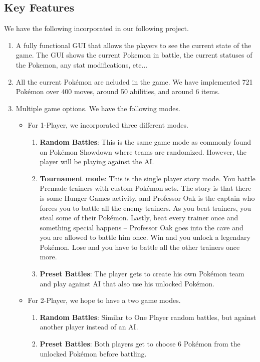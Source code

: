 \documentclass{scrreprt}
\begin{document}
\subsection{Key Features}
We have the following incorporated in our following project.
\begin{enumerate}
	\item A fully functional GUI that allows the players to see the current state of the game. The GUI shows the current Pokemon in battle, the current statuses of the Pokemon, any stat modifications, etc... 
	\item All the current Pok\'emon are ncluded in the game. We have implemented 721 Pok\'emon over 400 moves, around 50 abilities, and around 6 items.
	\item Multiple game options. We have the following modes.
		\begin{itemize}
			\item For 1-Player, we incorporated three different modes. 
				\begin{enumerate}
					\item \textbf{Random Battles}: This is the same game mode as commonly found on Pok\'emon Showdown where teams are randomized. However, the player will be playing against the AI. 
					\item \textbf{Tournament mode}: This is the single player story mode. You battle Premade trainers with custom Pok\'emon sets. The story is that there is some Hunger Games activity, and Professor Oak is the captain who forces you to battle all the enemy trainers. As you beat trainers, you steal some of their Pok\'emon. Lastly, beat every trainer once and something special happens -- Professor Oak goes into the cave and you are allowed to battle him once. Win and you unlock a legendary Pok\'emon. Lose and you have to battle all the other trainers once more.
					\item \textbf{Preset Battles}: The player gets to create his own Pok\'emon team and play against AI that also use his unlocked Pok\'emon. 
				\end{enumerate}
			\item For 2-Player, we hope to have a two game modes.
				\begin{enumerate}
					\item \textbf{Random Battles}: Similar to One Player random battles, but against another player instead of an AI. 
					\item \textbf{Preset Battles}: Both players get to choose 6 Pok\'emon from the unlocked Pok\'emon before battling.

\end{enumerate}
\end{itemize}
\end{enumerate}
\end{document}
